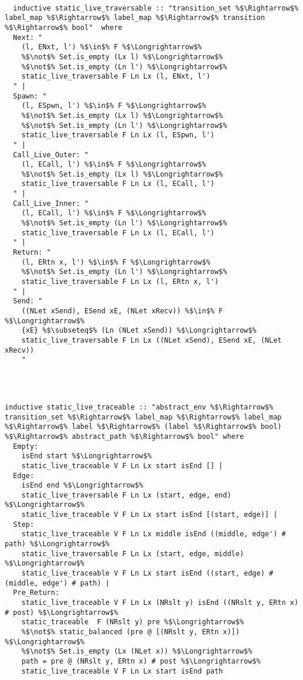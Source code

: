 \documentclass{article}
\begin{document}
\begin{lstlisting}[style=codestyle1, escapechar=\%]

  inductive static_live_traversable :: "transition_set %$\Rightarrow$% label_map %$\Rightarrow$% label_map %$\Rightarrow$% transition %$\Rightarrow$% bool"  where
  Next: "
    (l, ENxt, l') %$\in$% F %$\Longrightarrow$%
    %$\not$% Set.is_empty (Lx l) %$\Longrightarrow$%
    %$\not$% Set.is_empty (Ln l') %$\Longrightarrow$%
    static_live_traversable F Ln Lx (l, ENxt, l')
  " |
  Spawn: "
    (l, ESpwn, l') %$\in$% F %$\Longrightarrow$%
    %$\not$% Set.is_empty (Lx l) %$\Longrightarrow$%
    %$\not$% Set.is_empty (Ln l') %$\Longrightarrow$%
    static_live_traversable F Ln Lx (l, ESpwn, l')
  " |
  Call_Live_Outer: "
    (l, ECall, l') %$\in$% F %$\Longrightarrow$%
    %$\not$% Set.is_empty (Lx l) %$\Longrightarrow$%
    static_live_traversable F Ln Lx (l, ECall, l')
  " |
  Call_Live_Inner: "
    (l, ECall, l') %$\in$% F %$\Longrightarrow$%
    %$\not$% Set.is_empty (Ln l') %$\Longrightarrow$%
    static_live_traversable F Ln Lx (l, ECall, l')
  " |
  Return: "
    (l, ERtn x, l') %$\in$% F %$\Longrightarrow$%
    %$\not$% Set.is_empty (Ln l') %$\Longrightarrow$%
    static_live_traversable F Ln Lx (l, ERtn x, l')
  " |
  Send: "
    ((NLet xSend), ESend xE, (NLet xRecv)) %$\in$% F %$\Longrightarrow$%
    {xE} %$\subseteq$% (Ln (NLet xSend)) %$\Longrightarrow$%
    static_live_traversable F Ln Lx ((NLet xSend), ESend xE, (NLet xRecv))
    "
    
  \end{lstlisting}


\begin{lstlisting}[style=codestyle1, escapechar=\%]

  
inductive static_live_traceable :: "abstract_env %$\Rightarrow$% transition_set %$\Rightarrow$% label_map %$\Rightarrow$% label_map %$\Rightarrow$% label %$\Rightarrow$% (label %$\Rightarrow$% bool) %$\Rightarrow$% abstract_path %$\Rightarrow$% bool" where
  Empty:
    isEnd start %$\Longrightarrow$%
    static_live_traceable V F Ln Lx start isEnd [] |
  Edge:
    isEnd end %$\Longrightarrow$%
    static_live_traversable F Ln Lx (start, edge, end) %$\Longrightarrow$%
    static_live_traceable V F Ln Lx start isEnd [(start, edge)] |
  Step:
    static_live_traceable V F Ln Lx middle isEnd ((middle, edge') # path) %$\Longrightarrow$%
    static_live_traversable F Ln Lx (start, edge, middle) %$\Longrightarrow$%
    static_live_traceable V F Ln Lx start isEnd ((start, edge) # (middle, edge') # path) |
  Pre_Return:
    static_live_traceable V F Ln Lx (NRslt y) isEnd ((NRslt y, ERtn x) # post) %$\Longrightarrow$%
    static_traceable  F (NRslt y) pre %$\Longrightarrow$%
    %$\not$% static_balanced (pre @ [(NRslt y, ERtn x)]) %$\Longrightarrow$%
    %$\not$% Set.is_empty (Lx (NLet x)) %$\Longrightarrow$%
    path = pre @ (NRslt y, ERtn x) # post %$\Longrightarrow$%
    static_live_traceable V F Ln Lx start isEnd path
    
  \end{lstlisting}
\end{document}
